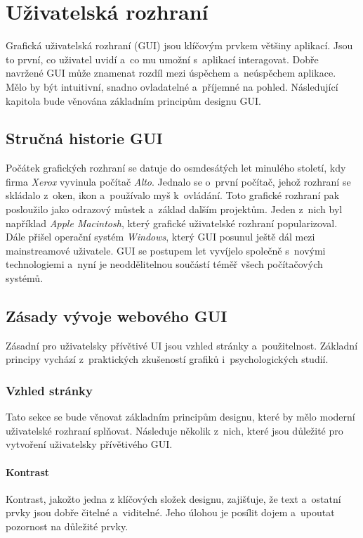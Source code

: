 \chapter{Uživatelská rozhraní}
Grafická uživatelská rozhraní (GUI) jsou klíčovým prvkem většiny aplikací. Jsou to první, co uživatel uvidí a~co mu umožní s~aplikací interagovat. Dobře navržené GUI může znamenat rozdíl mezi úspěchem a~neúspěchem aplikace. Mělo by být intuitivní, snadno ovladatelné a~příjemné na pohled. Následující kapitola bude věnována základním principům designu GUI.

\section{Stručná historie GUI}
Počátek grafických rozhraní se datuje do osmdesátých let minulého století, kdy firma \textit{Xerox} vyvinula počítač \textit{Alto}. Jednalo se o~první počítač, jehož rozhraní se skládalo z~oken, ikon a~používalo myš k~ovládání. Toto grafické rozhraní pak posloužilo jako odrazový můstek a~základ dalším projektům. Jeden z~nich byl například \textit{Apple Macintosh}, který grafické uživatelské rozhraní popularizoval. Dále přišel operační systém \textit{Windows}, který GUI posunul ještě dál mezi mainstreamové uživatele. GUI se postupem let vyvíjelo společně s~novými technologiemi a~nyní je neoddělitelnou součástí téměř všech počítačových systémů.

\section{Zásady vývoje webového GUI}
Zásadní pro uživatelsky přívětivé UI jsou vzhled stránky a~použitelnost. Základní principy vychází z~praktických zkušeností grafiků i~psychologických studií.

\subsection{Vzhled stránky}
Tato sekce se bude věnovat základním principům designu, které by mělo moderní uživatelské rozhraní splňovat. Následuje několik z~nich, které jsou důležité pro vytvoření uživatelsky přívětivého GUI. \cite{principles_of_design}

\subsubsection*{Kontrast}
Kontrast, jakožto jedna z klíčových složek designu, zajišťuje, že text a~ostatní prvky jsou dobře čitelné a~viditelné. Jeho úlohou je posílit dojem a~upoutat pozornost na důležité prvky.


